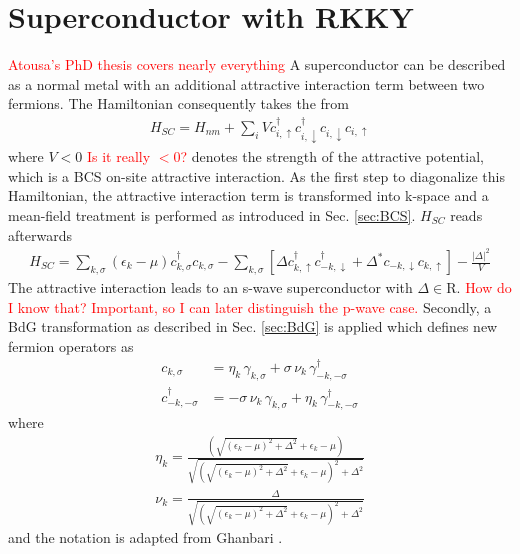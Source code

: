 \section{Superconductor with RKKY}
\textcolor{red}{Atousa's PhD thesis covers nearly everything}
A superconductor can be described as a normal metal with an additional attractive interaction term between two fermions.
The Hamiltonian consequently takes the from
\begin{align}\nonumber
    H_{SC} = H_{nm} + \sum_i V c^{\dag}_{i,\uparrow}c^{\dag}_{i,\downarrow}c_{i,\downarrow}c_{i,\uparrow}
\end{align}
where $V < 0$ \textcolor{red}{Is it really $<0$?} denotes the strength of the attractive potential, which is a BCS on-site attractive interaction.\newline
As the first step to diagonalize this Hamiltonian, the attractive interaction term is transformed into k-space and a mean-field treatment is performed as introduced in Sec. \ref{sec:BCS}.
$H_{SC}$ reads afterwards
\begin{align} \nonumber
    H_{SC} = \sum_{k,\sigma} (\epsilon_k - \mu)c^{\dag}_{k,\sigma}c_{k,\sigma} - \sum_{k,\sigma}\left[\Delta c^{\dag}_{k,\uparrow}c^{\dag}_{-k,\downarrow} + \Delta^*c_{-k,\downarrow}c_{k,\uparrow}\right] - \frac{|\Delta|^2}{V}
\end{align}
The attractive interaction leads to an s-wave superconductor with $\Delta \in \mathrm{R}$.
\textcolor{red}{How do I know that? Important, so I can later distinguish the p-wave case.}\newline
Secondly, a BdG transformation as described in Sec. \ref{sec:BdG} is applied which defines new fermion operators as
\begin{align}\nonumber
    c_{k,\sigma} &= \eta_k \, \gamma_{k,\sigma} + \sigma\, \nu_k\, \gamma^{\dag}_{-k,-\sigma} \\ \nonumber
    c^{\dag}_{-k,-\sigma} &=  -\sigma\, \nu_k\, \gamma_{k,\sigma} + \eta_k \, \gamma^{\dag}_{-k,-\sigma}
\end{align}
where
\begin{align} \nonumber
    \eta_k =  \frac{(\sqrt{(\epsilon_k-\mu)^2+\Delta^2}+\epsilon_k-\mu)}{\sqrt{(\sqrt{(\epsilon_k-\mu)^2+\Delta^2}+\epsilon_k-\mu)^2+\Delta^2}} \\ \nonumber
    \nu_k = \frac{\Delta}{\sqrt{(\sqrt{(\epsilon_k-\mu)^2+\Delta^2}+\epsilon_k-\mu)^2+\Delta^2}}
\end{align}
and the notation is adapted from Ghanbari \cite{ghanbari_rkky_nodate}. \newline
